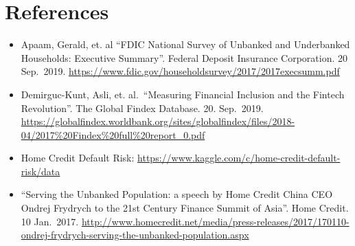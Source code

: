 \documentclass[]{book}
\begin{document}
\hypertarget{references}{%
\chapter{References}\label{references}}

\begin{itemize}
\item
  Apaam, Gerald, et. al ``FDIC National Survey of Unbanked and Underbanked Households: Executive Summary''. Federal Deposit Insurance Corporation. 20 Sep.~2019. \url{https://www.fdic.gov/householdsurvey/2017/2017execsumm.pdf}
\item
  Demirguc-Kunt, Asli, et. al.~``Measuring Financial Inclusion and the Fintech Revolution''. The Global Findex Database. 20. Sep.~2019. \url{https://globalfindex.worldbank.org/sites/globalfindex/files/2018-04/2017\%20Findex\%20full\%20report_0.pdf}
\item
  Home Credit Default Risk: \url{https://www.kaggle.com/c/home-credit-default-risk/data}
\item
  ``Serving the Unbanked Population: a speech by Home Credit China CEO Ondrej Frydrych to the 21st Century Finance Summit of Asia''. Home Credit. 10 Jan.~2017. \url{http://www.homecredit.net/media/press-releases/2017/170110-ondrej-frydrych-serving-the-unbanked-population.aspx}
\end{itemize}


\end{document}
